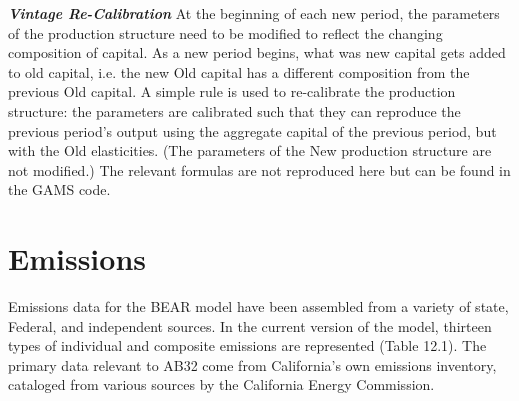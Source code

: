 \documentclass{article}
\begin{document}
\textbf{\textit{Vintage Re-Calibration}}
At the beginning of each new period, the parameters of the production structure need to be modified to reflect the changing composition of capital. As a new period begins, what was new capital gets added to old capital, i.e. the new Old capital has a different composition from the previous Old capital. A simple rule is used to re-calibrate the production structure: the parameters are calibrated such that they can reproduce the previous period’s output using the aggregate capital of the previous period, but with the Old elasticities. (The parameters of the New production structure are not modified.) The relevant formulas are not reproduced here but can be found in the GAMS code.


\section{Emissions}

Emissions data for the BEAR model have been assembled from a variety of state, Federal, and independent sources. In the current version of the model, thirteen types of individual and composite emissions are represented (Table 12.1). The primary data relevant to AB32 come from California's own emissions inventory, cataloged from various sources by the California Energy Commission.
\end{document}
